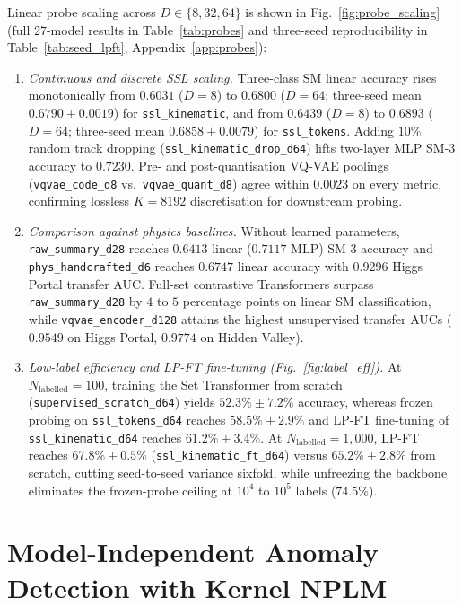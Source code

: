 \documentclass{article}
\begin{document}
Linear probe scaling across $D \in \{8, 32, 64\}$ is shown in Fig.~\ref{fig:probe_scaling} (full 27-model results in Table~\ref{tab:probes} and three-seed reproducibility in Table~\ref{tab:seed_lpft}, Appendix~\ref{app:probes}):
\begin{enumerate}
    \item \emph{Continuous and discrete SSL scaling.} Three-class SM linear accuracy rises monotonically from $0.6031$ ($D=8$) to $0.6800$ ($D=64$; three-seed mean $0.6790 \pm 0.0019$) for \texttt{ssl\_kinematic}, and from $0.6439$ ($D=8$) to $0.6893$ ($D=64$; three-seed mean $0.6858 \pm 0.0079$) for \texttt{ssl\_tokens}. Adding $10\%$ random track dropping (\texttt{ssl\_kinematic\_drop\_d64}) lifts two-layer MLP SM-3 accuracy to $0.7230$. Pre- and post-quantisation VQ-VAE poolings (\texttt{vqvae\_code\_d8} vs.\ \texttt{vqvae\_quant\_d8}) agree within $0.0023$ on every metric, confirming lossless $K=8192$ discretisation for downstream probing.
    \item \emph{Comparison against physics baselines.} Without learned parameters, \texttt{raw\_summary\_d28} reaches $0.6413$ linear ($0.7117$ MLP) SM-3 accuracy and \texttt{phys\_handcrafted\_d6} reaches $0.6747$ linear accuracy with $0.9296$ Higgs Portal transfer AUC. Full-set contrastive Transformers surpass \texttt{raw\_summary\_d28} by $4$ to $5$ percentage points on linear SM classification, while \texttt{vqvae\_encoder\_d128} attains the highest unsupervised transfer AUCs ($0.9549$ on Higgs Portal, $0.9774$ on Hidden Valley).
    \item \emph{Low-label efficiency and LP-FT fine-tuning (Fig.~\ref{fig:label_eff}).} At $N_{\text{labelled}} = 100$, training the Set Transformer from scratch (\texttt{supervised\_scratch\_d64}) yields $52.3\% \pm 7.2\%$ accuracy, whereas frozen probing on \texttt{ssl\_tokens\_d64} reaches $58.5\% \pm 2.9\%$ and LP-FT fine-tuning of \texttt{ssl\_kinematic\_d64} reaches $61.2\% \pm 3.4\%$. At $N_{\text{labelled}} = 1,000$, LP-FT reaches $67.8\% \pm 0.5\%$ (\texttt{ssl\_kinematic\_ft\_d64}) versus $65.2\% \pm 2.8\%$ from scratch, cutting seed-to-seed variance sixfold, while unfreezing the backbone eliminates the frozen-probe ceiling at $10^4$ to $10^5$ labels ($74.5\%$).
\end{enumerate}

\section{Model-Independent Anomaly Detection with Kernel NPLM}
\label{sec:nplm}
\end{document}
